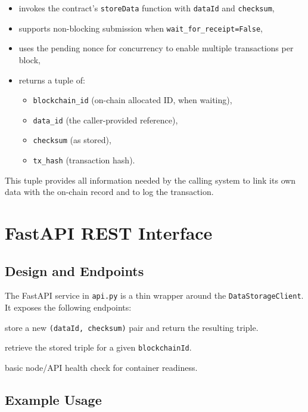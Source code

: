 \documentclass[11pt,a4paper]{article}
\begin{document}
\begin{itemize}[noitemsep]
  \item invokes the contract's \texttt{storeData} function with \texttt{dataId} and \texttt{checksum},
  \item supports non-blocking submission when \texttt{wait\_for\_receipt=False},
  \item uses the pending nonce for concurrency to enable multiple transactions per block,
  \item returns a tuple of:
        \begin{itemize}
          \item \texttt{blockchain\_id} (on-chain allocated ID, when waiting),
          \item \texttt{data\_id} (the caller-provided reference),
          \item \texttt{checksum} (as stored),
          \item \texttt{tx\_hash} (transaction hash).
        \end{itemize}
\end{itemize}

This tuple provides all information needed by the calling system to link its own data with the on-chain record and to log the transaction.

\section{FastAPI REST Interface}

\subsection{Design and Endpoints}

The FastAPI service in \texttt{api.py} is a thin wrapper around the \texttt{DataStorageClient}. It exposes the following endpoints:

\begin{description}[noitemsep]
  \item[\texttt{POST /store}] store a new \texttt{(dataId, checksum)} pair and return the resulting triple.
  \item[\texttt{GET /data/\{blockchain\_id\}}] retrieve the stored triple for a given \texttt{blockchainId}.
  \item[\texttt{GET /health}] basic node/API health check for container readiness.
\end{description}

\subsection{Example Usage}
\end{document}
